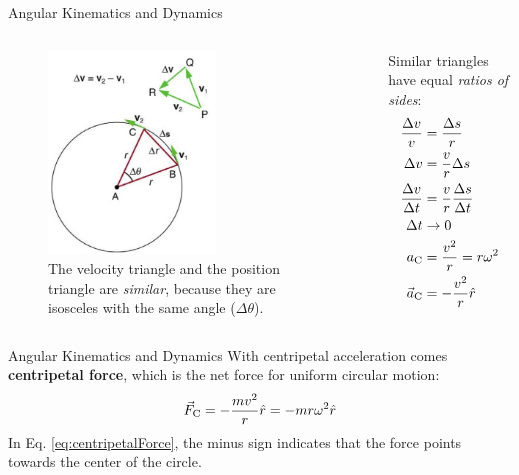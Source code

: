 \documentclass{beamer}
\begin{document}
\begin{frame}{Angular Kinematics and Dynamics}
\begin{columns}[T]
\begin{column}{0.5\textwidth}
\begin{figure}
\includegraphics[width=0.6\textwidth]{figures/circle2.png}
\caption{\label{fig:circle3} \small The velocity triangle and the position triangle are \textit{similar}, because they are isosceles with the same angle ($\Delta\theta$).}
\end{figure}
\end{column}
\begin{column}{0.5\textwidth}
\centering
Similar triangles have equal \textit{ratios of sides}:
\begin{align}
\frac{\Delta v}{v} &= \frac{\Delta s}{r} \\
\Delta v &= \frac{v}{r}\Delta s \\
\frac{\Delta v}{\Delta t} &= \frac{v}{r}\frac{\Delta s}{\Delta t} \\
\Delta t &\to 0 \\
a_{\rm C} &= \frac{v^2}{r} = r \omega^2 \\
\vec{a}_{\rm C} &= - \frac{v^2}{r} \hat{r}
\end{align}
\end{column}
\end{columns}
\end{frame}

\begin{frame}{Angular Kinematics and Dynamics}
With centripetal acceleration comes \textbf{\alert{centripetal force}}, which is the net force for uniform circular motion:
\begin{equation}
\vec{F}_{\rm C} = - \frac{mv^2}{r}\hat{r} = -m r \omega^2 \hat{r}
\label{eq:centripetalForce}
\end{equation}
In Eq. \ref{eq:centripetalForce}, the minus sign indicates that the force points towards the center of the circle.
\end{frame}
\end{document}
